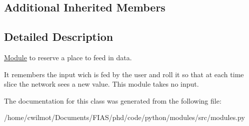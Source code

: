 \subsection*{Additional Inherited Members}


\subsection{Detailed Description}
\hyperlink{classmodules_1_1_module}{Module} to reserve a place to feed in data. 

It remembers the input wich is fed by the user and roll it so that at each time slice the network sees a new value. This module takes no input. 

The documentation for this class was generated from the following file\+:\begin{DoxyCompactItemize}
\item 
/home/cwilmot/\+Documents/\+F\+I\+A\+S/phd/code/python/modules/src/modules.\+py\end{DoxyCompactItemize}
